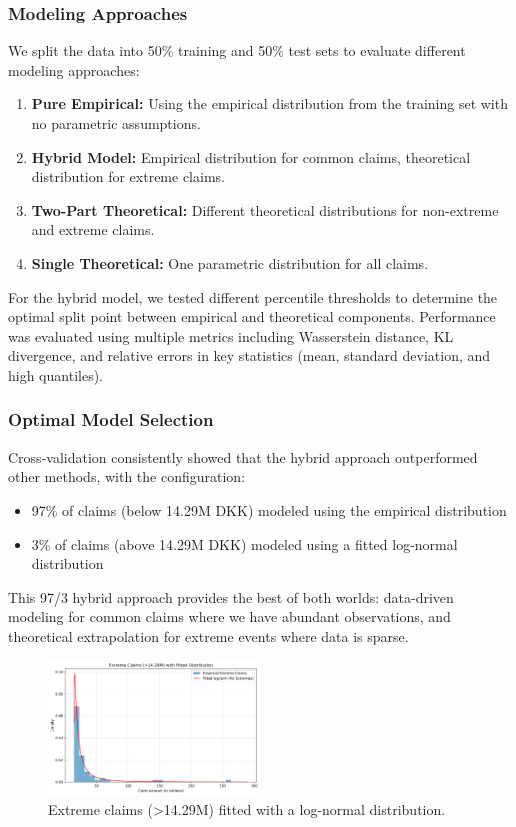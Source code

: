 \documentclass[8pt]{article}
\begin{document}
\subsubsection{Modeling Approaches}
We split the data into 50\% training and 50\% test sets to evaluate different modeling approaches:

\begin{enumerate}
    \item \textbf{Pure Empirical:} Using the empirical distribution from the training set with no parametric assumptions.
    \item \textbf{Hybrid Model:} Empirical distribution for common claims, theoretical distribution for extreme claims.
    \item \textbf{Two-Part Theoretical:} Different theoretical distributions for non-extreme and extreme claims.
    \item \textbf{Single Theoretical:} One parametric distribution for all claims.
\end{enumerate}

For the hybrid model, we tested different percentile thresholds to determine the optimal split point between empirical and theoretical components. Performance was evaluated using multiple metrics including Wasserstein distance, KL divergence, and relative errors in key statistics (mean, standard deviation, and high quantiles).

\subsubsection{Optimal Model Selection}
Cross-validation consistently showed that the hybrid approach outperformed other methods, with the configuration:
\begin{itemize}
    \item 97\% of claims (below 14.29M DKK) modeled using the empirical distribution
    \item 3\% of claims (above 14.29M DKK) modeled using a fitted log-normal distribution
\end{itemize}

This 97/3 hybrid approach provides the best of both worlds: data-driven modeling for common claims where we have abundant observations, and theoretical extrapolation for extreme events where data is sparse.

\begin{figure}[h]
    \centering
    \includegraphics[width=0.5\textwidth]{Figures/extreme_claims_fit_97.png}
    \caption{Extreme claims (>14.29M) fitted with a log-normal distribution.}
    \label{fig:extreme-fit}
\end{figure}
\end{document}
